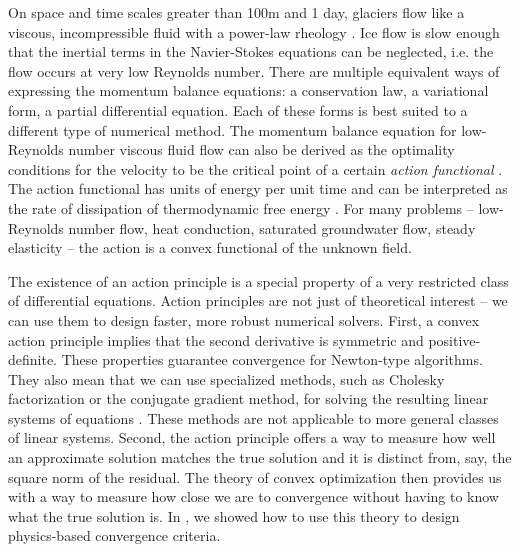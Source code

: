 \documentclass[review,oneside]{igs}
\begin{document}
On space and time scales greater than 100m and 1 day, glaciers flow like a viscous, incompressible fluid with a power-law rheology \citep{greve2009dynamics}.
Ice flow is slow enough that the inertial terms in the Navier-Stokes equations can be neglected, i.e. the flow occurs at very low Reynolds number.
There are multiple equivalent ways of expressing the momentum balance equations: a conservation law, a variational form, a partial differential equation.
Each of these forms is best suited to a different type of numerical method.
The momentum balance equation for low-Reynolds number viscous fluid flow can also be derived as the optimality conditions for the velocity to be the critical point of a certain \emph{action functional} \citep{dukowicz2010consistent}.
The action functional has units of energy per unit time and can be interpreted as the rate of dissipation of thermodynamic free energy \citep{edelen1972nonlinear}.
For many problems -- low-Reynolds number flow, heat conduction, saturated groundwater flow, steady elasticity -- the action is a convex functional of the unknown field.

The existence of an action principle is a special property of a very restricted class of differential equations.
Action principles are not just of theoretical interest -- we can use them to design faster, more robust numerical solvers.
First, a convex action principle implies that the second derivative is symmetric and positive-definite.
These properties guarantee convergence for Newton-type algorithms.
They also mean that we can use specialized methods, such as Cholesky factorization or the conjugate gradient method, for solving the resulting linear systems of equations \citep{nocedal2006numerical}.
These methods are not applicable to more general classes of linear systems.
Second, the action principle offers a way to measure how well an approximate solution matches the true solution and it is distinct from, say, the square norm of the residual.
The theory of convex optimization then provides us with a way to measure how close we are to convergence without having to know what the true solution is.
In \citet{shapero2021icepack}, we showed how to use this theory to design physics-based convergence criteria.
\end{document}
